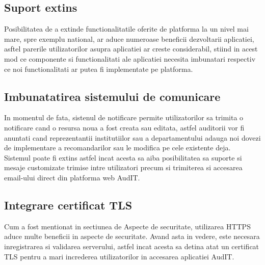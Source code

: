 \subsection*{Suport extins}

Posibilitatea de a extinde functionalitatile oferite de platforma la un nivel mai mare, spre exemplu national, ar aduce numeroase beneficii dezvoltarii aplicatiei, asftel parerile utilizatorilor asupra aplicatiei ar creste considerabil, stiind in acest mod ce componente si functionalitati ale aplicatiei necesita imbunatari respectiv ce noi functionalitati ar putea fi implementate pe platforma.


\subsection*{Imbunatatirea sistemului de comunicare}
In momentul de fata, sistenul de notificare permite utilizatorilor sa trimita o notificare cand o resursa noua a fost creata sau editata, astfel auditorii vor fi anuntati cand reprezentantii institutiilor sau a departamentului adauga noi dovezi de implementare a recomandarilor sau le modifica pe cele existente deja. \\
Sistemul poate fi extins astfel incat acesta sa aiba posibilitatea sa suporte si mesaje customizate trimise intre utilizatori precum si trimiterea si accesarea email-ului direct din platforma web AudIT.

\subsection*{Integrare certificat TLS}

Cum a fost mentionat in sectiunea de Aspecte de securitate, utilizarea HTTPS aduce multe beneficii in aspecte de securitate. Avand asta in vedere, este necesara inregistrarea si validarea serverului, astfel incat acesta sa detina atat un certificat TLS pentru a mari increderea utilizatorilor in accesarea aplicatiei AudIT.

